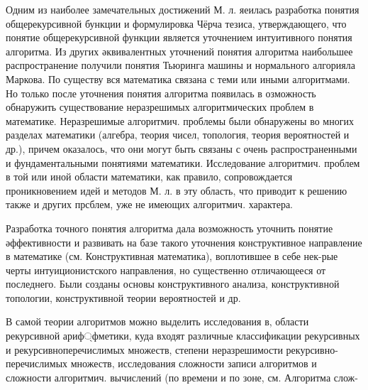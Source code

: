 \documentclass[10pt]{article}
\begin{document}
Одним из наиболее замечательных достижений М. л. яеилась разработка понятия общерекурсивной бункции и формулировка Чёрча тезиса, утверждающего, что понятие общерекурсивной функции является уточнением интуитивного понятия алгоритма. Из других әквивалентных уточнений понятия алгоритма наибольшее распространение получили понятия Тьюринга машины и нормального алгорияла Маркова. По существу вся математика связана с теми или иными алгоритмами. Но только после уточнения понятия алгоритма появилась в озможность обнаружить существование неразрешимых алгоритмических проблем в математике. Неразрешимые алгоритмич. проблемы были обнаружены во многих разделах математики (алгебра, теория чисел, топология, теория вероятностей и др.), причем оказалось, что они могут быть связаны с очень распространенными и фундаментальными понятиями математики. Исследование алгоритмич. проблем в той или иной области математики, как правило, сопровождается проникновением идей и методов М. л. в эту область, что приводит к решению также и других прсблем, уже не имеющих алгоритмич. характера.



Разработка точного понятия алгоритма дала возможность уточнить понятие әффективности и развивать на базе такого уточнения конструктивное направление в математике (см. Конструктивная математика), воплотившее в себе нек-рые черты интуиционистского направления, но существенно отличающееся от последнего. Были созданы основы конструктивного анализа, конструктивной топологии, конструктивной теории вероятностей и др.



В самой теории алгоритмов можно выделить исследования в, области рекурсивной ариф্фметики, куда входят различные классификации рекурсивных и рекурсивноперечислимых множеств, степени неразрешимости рекурсивно-перечислимых множеств, исследования сложности записи алгоритмов и сложности алгоритмич. вычислений (по времени и по зоне, см. Алгоритма слож-
\end{document}
